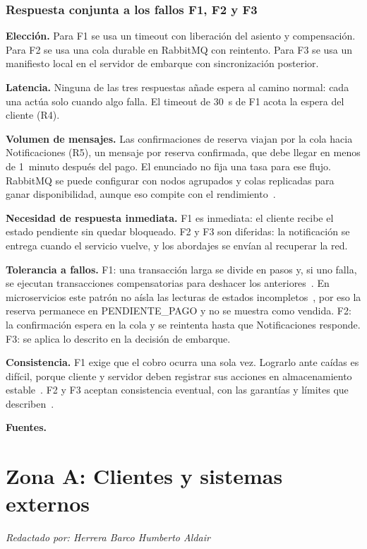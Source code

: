 \documentclass[11pt,a4paper]{article}
\newcommand{\autor}[1]{\par{\small\textit{Redactado por: #1}}\par}
\newcommand{\decision}[8]{\subsubsection*{#1}%
  \textbf{Elección.} #2\par
  \textbf{Latencia.} #3\par
  \textbf{Volumen de mensajes.} #4\par
  \textbf{Necesidad de respuesta inmediata.} #5\par
  \textbf{Tolerancia a fallos.} #6\par
  \textbf{Consistencia.} #7\par
  \textbf{Fuentes.} #8\par}
\newcommand{\integranteA}{Herrera Barco Humberto Aldair}
\begin{document}
\decision{Respuesta conjunta a los fallos F1, F2 y F3}
 {Para F1 se usa un timeout con liberación del asiento y compensación. Para F2 se usa una cola durable en RabbitMQ con reintento. Para F3 se usa un manifiesto local en el servidor de embarque con sincronización posterior.}
 {Ninguna de las tres respuestas añade espera al camino normal: cada una actúa solo cuando algo falla. El timeout de 30~s de F1 acota la espera del cliente (R4).}
 {Las confirmaciones de reserva viajan por la cola hacia Notificaciones (R5), un mensaje por reserva confirmada, que debe llegar en menos de 1~minuto después del pago. El enunciado no fija una tasa para ese flujo. RabbitMQ se puede configurar con nodos agrupados y colas replicadas para ganar disponibilidad, aunque eso compite con el rendimiento~\cite{rostanski2014rabbitmq}.}
 {F1 es inmediata: el cliente recibe el estado pendiente sin quedar bloqueado. F2 y F3 son diferidas: la notificación se entrega cuando el servicio vuelve, y los abordajes se envían al recuperar la red.}
 {F1: una transacción larga se divide en pasos y, si uno falla, se ejecutan transacciones compensatorias para deshacer los anteriores~\cite{garciamolina1987sagas}. En microservicios este patrón no aísla las lecturas de estados incompletos~\cite{daraghmi2022saga}, por eso la reserva permanece en PENDIENTE\_PAGO y no se muestra como vendida. F2: la confirmación espera en la cola y se reintenta hasta que Notificaciones responde. F3: se aplica lo descrito en la decisión de embarque.}
 {F1 exige que el cobro ocurra una sola vez. Lograrlo ante caídas es difícil, porque cliente y servidor deben registrar sus acciones en almacenamiento estable~\cite{ivaki2012exactlyonce}. F2 y F3 aceptan consistencia eventual, con las garantías y límites que describen~\cite{bailis2013eventual}.}
 {\cite{garciamolina1987sagas,daraghmi2022saga,ivaki2012exactlyonce,rostanski2014rabbitmq,bailis2013eventual}}
 

\section{Zona A: Clientes y sistemas externos}\label{sec:zonaA}
\autor{\integranteA}
\end{document}
